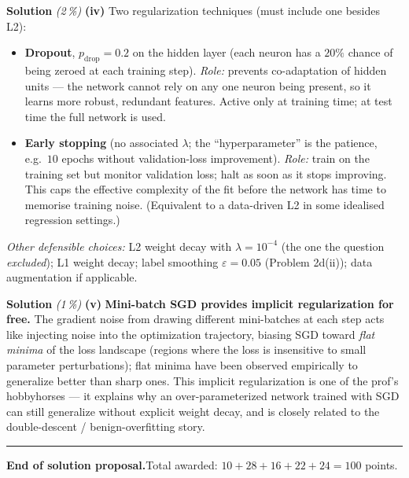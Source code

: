 \documentclass[11pt,a4paper]{article}
\newcommand{\subpoints}[1]{\textit{(#1\,\%)}}
\newcommand{\sol}{\noindent\textbf{Solution}}
\begin{document}
\medskip
\sol{} \subpoints{2} \textbf{(iv)} Two regularization techniques (must include one besides L2):
\begin{itemize}
  \item \textbf{Dropout}, $p_{\mathrm{drop}} = 0.2$ on the hidden layer (each neuron has a $20\%$
        chance of being zeroed at each training step). \emph{Role:} prevents co-adaptation of
        hidden units --- the network cannot rely on any one neuron being present, so it learns
        more robust, redundant features. Active only at training time; at test time the full
        network is used.
  \item \textbf{Early stopping} (no associated $\lambda$; the ``hyperparameter'' is the patience,
        e.g.\ $10$ epochs without validation-loss improvement). \emph{Role:} train on the
        training set but monitor validation loss; halt as soon as it stops improving. This caps
        the effective complexity of the fit before the network has time to memorise training
        noise. (Equivalent to a data-driven L2 in some idealised regression settings.)
\end{itemize}
\emph{Other defensible choices:} L2 weight decay with $\lambda = 10^{-4}$ (the one the question
\emph{excluded}); L1 weight decay; label smoothing $\varepsilon = 0.05$ (Problem 2d(ii)); data
augmentation if applicable.

\medskip
\sol{} \subpoints{1} \textbf{(v)} \textbf{Mini-batch SGD provides implicit regularization for
free.} The gradient noise from drawing different mini-batches at each step acts like injecting
noise into the optimization trajectory, biasing SGD toward \emph{flat minima} of the loss
landscape (regions where the loss is insensitive to small parameter perturbations); flat minima
have been observed empirically to generalize better than sharp ones. This implicit regularization
is one of the prof's hobbyhorses --- it explains why an over-parameterized network trained with
SGD can still generalize without explicit weight decay, and is closely related to the
double-descent / benign-overfitting story.

\vspace{1em}
\hrule
\vspace{0.5em}

\noindent\textbf{End of solution proposal.}\quad Total awarded: $10+28+16+22+24=100$ points.
\end{document}
